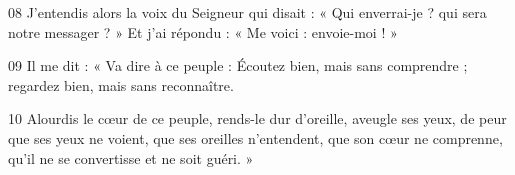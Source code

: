 
08 J’entendis alors la voix du Seigneur qui disait : « Qui enverrai-je ? qui sera notre messager ? » Et j’ai répondu : « Me voici : envoie-moi ! »

09 Il me dit : « Va dire à ce peuple : Écoutez bien, mais sans comprendre ; regardez bien, mais sans reconnaître.

10 Alourdis le cœur de ce peuple, rends-le dur d’oreille, aveugle ses yeux, de peur que ses yeux ne voient, que ses oreilles n’entendent, que son cœur ne comprenne, qu’il ne se convertisse et ne soit guéri. »